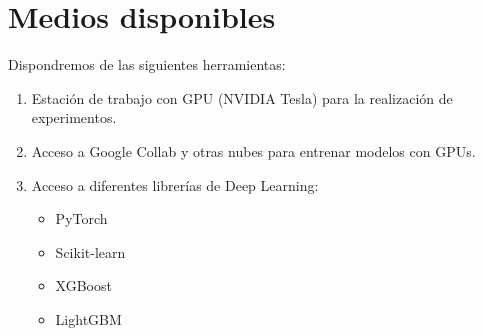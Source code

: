 \documentclass[12pt,oneside,a4paper]{article}
\begin{document}
\section{Medios disponibles}

Dispondremos de las siguientes herramientas:

\begin{enumerate}
	\item Estación de trabajo con GPU (NVIDIA Tesla) para la realización de experimentos.
	\item Acceso a Google Collab y otras nubes para entrenar modelos con GPUs.
	\item Acceso a diferentes librerías de Deep Learning:
	\begin{itemize}
	\item PyTorch
	\item Scikit-learn
	\item XGBoost
	\item LightGBM
	\end{itemize}
\end{enumerate}

 


\end{document}
